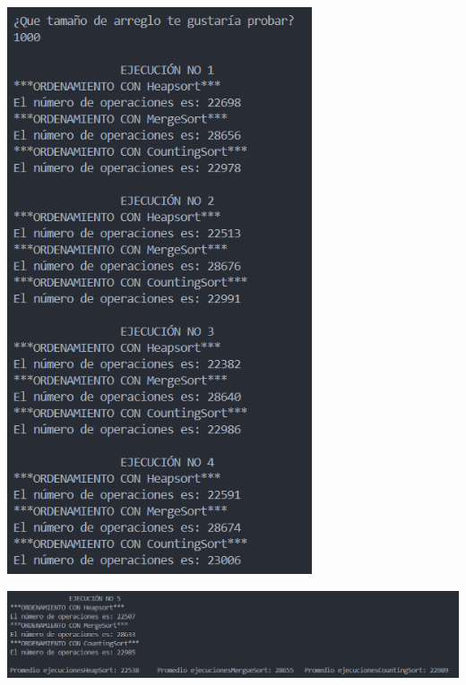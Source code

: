 \documentclass[12pt]{article}
\begin{document}
\includegraphics[width=9cm]{Images/Tam.1000/1.png}
\par\vspace{0.4cm}
\includegraphics[width=16cm]{Images/Tam.1000/2.png}
\par\vspace{0.4cm}
\end{document}
